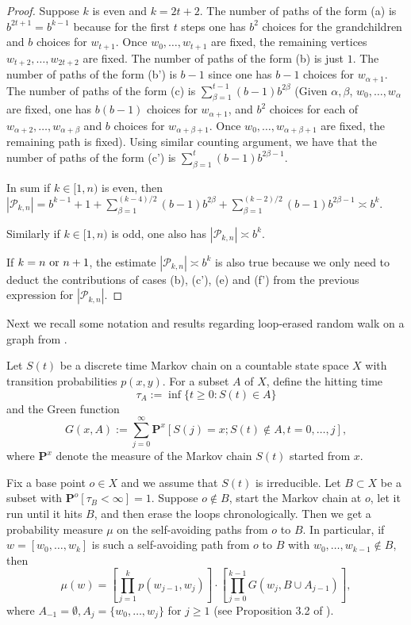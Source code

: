 \documentclass[12pt]{article}
\numberwithin{equation}{section}
\newcommand{\be}{\begin{equation}}
\newcommand{\ee}{\end{equation}}
\newcommand{\1}{\mathbf{1}}
\begin{document}
\begin{proof}
 	
 Suppose $k$ is even and $k=2t+2$. The number of paths of the form (a) is $b^{2t+1}=b^{k-1}$ because for the first $t$ steps one has $b^2$ choices for the grandchildren and $b$ choices for $w_{t+1}$. Once $w_0,\ldots,w_{t+1}$ are fixed, the remaining vertices $w_{t+2},\ldots,w_{2t+2}$ are fixed. The number of paths of the form (b) is just $1$. The number of paths of the form (b') is  $b-1$ since one has $b-1$ choices for $w_{\alpha+1}$. The number of paths of the form (c) is $\sum_{\beta=1}^{t-1}(b-1)b^{2\beta}$ (Given $\alpha,\beta$, $w_0,\ldots,w_\alpha$ are fixed, one has $b(b-1)$ choices for $w_{\alpha+1}$, and $b^2$ choices for each of $w_{\alpha+2},\ldots,w_{\alpha+\beta}$ and $b$ choices for  $w_{\alpha+\beta+1}$. Once $w_0,\ldots,w_{\alpha+\beta+1}$ are fixed, the remaining path  is fixed). Using similar counting argument, we have that the number of paths of the form (c') is $\sum_{\beta=1}^{t}(b-1)b^{2\beta-1}$.
 	
 	
 	
 	
 	
 	In sum if $k\in[1,n)$ is even, then $|\mathscr{P}_{k,n}|=b^{k-1}+1+\sum_{\beta=1}^{(k-4)/2}(b-1)b^{2\beta}+\sum_{\beta=1}^{(k-2)/2}(b-1)b^{2\beta-1}\asymp b^k$. 
 	
 	Similarly if $k\in[1,n)$ is odd, one also has 
 	$|\mathscr{P}_{k,n}|\asymp b^k$. 
 	
 	If $k=n\textnormal{ or }n+1$, the estimate 	$|\mathscr{P}_{k,n}|\asymp b^k$ is also true because we only need to deduct the contributions of cases (b), (c'), (e) and (f') from the previous expression for $|\mathscr{P}_{k,n}|$.
 \end{proof}
 
 
 
 Next we recall some notation and results regarding loop-erased random walk on a graph from \cite{Lawler1999}.
 
 Let $S(t)$ be a discrete time Markov chain on a countable state space $X$ with transition probabilities $p(x,y)$. For a subset $A$ of $X$, define the hitting time 
 \[\tau_A:=\inf\{t\geq0: S(t)\in A \} \]
 and the Green function 
 \[
 G(x,A):=\sum_{j=0}^{\infty}\mathbf{P}^x[S(j)=x;S(t)\notin A,t=0,\ldots,j],
 \]
 where $\mathbf{P}^x$ denote the measure of the Markov chain $S(t)$ started from $x$. 
 
 Fix a base point $o\in X$ and we assume that $S(t)$ is irreducible. Let $B\subset X$ be a subset with $\mathbf{P}^o[\tau_B<\infty]=1$. Suppose $o\notin B$, start the Markov chain at $o$, let it run until it hits $B$, and then erase the loops chronologically. Then we get a probability measure $\mu$ on the self-avoiding paths from $o$ to $B$. In particular, if $w=[w_0,\ldots,w_k]$ is such a self-avoiding path from $o$ to $B$ with $w_0,\ldots,w_{k-1}\notin B$, then 
 \be\label{eq: probability of a loop-erased path}
 \mu(w)=\left[\prod_{j=1}^{k}p(w_{j-1},w_j)\right]\cdot
        \left[\prod_{j=0}^{k-1}G(w_{j},B\cup A_{j-1}) \right],
 \ee
 where $A_{-1}=\emptyset,A_j=\{w_0,\ldots,w_j \}$ for $j\geq 1$ (see Proposition 3.2 of \cite{Lawler2018}). 
 
\end{document}
